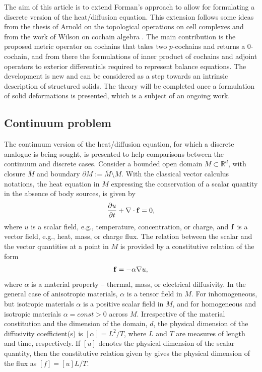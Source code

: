 \documentclass{elsarticle}
\theoremstyle{definition}
\newcommand{\R}{\mathbb{R}} %
\begin{document}
The aim of this article is to extend Forman's approach to allow for formulating a discrete version of the heat/diffusion equation. This extension follows some ideas from the thesis of Arnold on the topological operations on cell complexes 
\cite{arnold2012discrete} and from the work of Wilson on cochain algebra \cite{wilson2007cochain}. The main contribution is the proposed metric operator on cochains that takes two $p$-cochains and returns a 0-cochain, and from there the formulations of inner product of cochains and adjoint operators to exterior differentials required to represent balance equations. The development is new and can be considered as a step towards an intrinsic description of structured solids. The theory will be completed once a formulation of solid deformations is presented, which is a subject of an ongoing work.

\subsection{Continuum problem}
\label{sec:motivation}
The continuum version of the heat/diffusion equation, for which a discrete analogue is being sought, is presented to help comparisons between the continuum and discrete cases. Consider a bounded open domain $M \subset \R^{d}$, with closure $\overline{M}$ and boundary $\partial M := \overline{M} \setminus M$. With the classical vector calculus notations, the heat equation in $M$ expressing the conservation of a scalar quantity in the absence of body sources, is given by 
\begin{equation}
\label{eq:conservation}
  \frac{\partial u}{\partial t} + {\nabla} \cdot {\bf f} = 0,
\end{equation}
where $u$ is a scalar field, e.g., temperature, concentration, or charge, and ${\bf f}$ is a vector field, e.g., heat, mass, or charge flux. The relation between the scalar and the vector quantities at a point in $M$ is provided by a constitutive relation of the form
\begin{equation}
\label{eq:constitutive}
  {\bf f} = -\alpha \nabla u,
\end{equation}
where $\alpha$ is a material property -- thermal, mass, or electrical diffusivity. In the general case of anisotropic materials, $\alpha$ is a tensor field in $M$. For inhomogeneous, but isotropic materials $\alpha$ is a positive scalar field in $M$, and for homogeneous and isotropic materials $\alpha = const > 0$ across $M$. Irrespective of the material constitution and the dimension of the domain, $d$, the physical dimension of the diffusivity coefficient(s) is $[\alpha]=L^2/T$, where $L$ and $T$ are measures of length and time, respectively. If $[u]$ denotes the physical dimension of the scalar quantity, then the constitutive relation given by  gives the physical dimension of the flux as $[f]=[u]L/T$.
\end{document}
